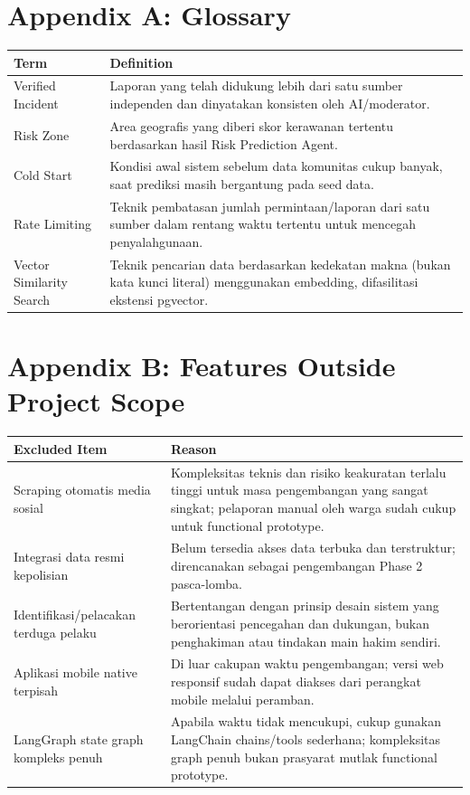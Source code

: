 \documentclass[11pt,a4paper]{article}
\begin{document}
\section*{Appendix A: Glossary}
\begin{tabularx}{\textwidth}{|L{4cm}|Y|}
\hline
{}\textbf{Term} & \textbf{Definition} \\ \hline
Verified Incident & Laporan yang telah didukung lebih dari satu sumber independen dan dinyatakan konsisten oleh AI/moderator. \\ \hline
Risk Zone & Area geografis yang diberi skor kerawanan tertentu berdasarkan hasil Risk Prediction Agent. \\ \hline
Cold Start & Kondisi awal sistem sebelum data komunitas cukup banyak, saat prediksi masih bergantung pada seed data. \\ \hline
Rate Limiting & Teknik pembatasan jumlah permintaan/laporan dari satu sumber dalam rentang waktu tertentu untuk mencegah penyalahgunaan. \\ \hline
Vector Similarity Search & Teknik pencarian data berdasarkan kedekatan makna (bukan kata kunci literal) menggunakan embedding, difasilitasi ekstensi pgvector. \\ \hline
\end{tabularx}

\newpage

\section*{Appendix B: Features Outside Project Scope}
\begin{tabularx}{\textwidth}{|L{4.6cm}|Y|}
\hline
{}\textbf{Excluded Item} & \textbf{Reason} \\ \hline
Scraping otomatis media sosial & Kompleksitas teknis dan risiko keakuratan terlalu tinggi untuk masa pengembangan yang sangat singkat; pelaporan manual oleh warga sudah cukup untuk functional prototype. \\ \hline
Integrasi data resmi kepolisian & Belum tersedia akses data terbuka dan terstruktur; direncanakan sebagai pengembangan Phase 2 pasca-lomba. \\ \hline
Identifikasi/pelacakan terduga pelaku & Bertentangan dengan prinsip desain sistem yang berorientasi pencegahan dan dukungan, bukan penghakiman atau tindakan main hakim sendiri. \\ \hline
Aplikasi mobile native terpisah & Di luar cakupan waktu pengembangan; versi web responsif sudah dapat diakses dari perangkat mobile melalui peramban. \\ \hline
LangGraph state graph kompleks penuh & Apabila waktu tidak mencukupi, cukup gunakan LangChain chains/tools sederhana; kompleksitas graph penuh bukan prasyarat mutlak functional prototype. \\ \hline
\end{tabularx}
\end{document}

